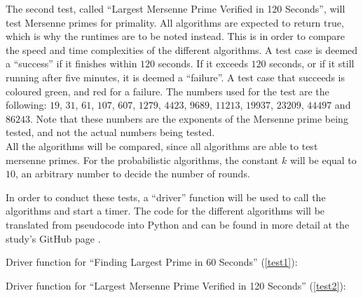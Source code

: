 \documentclass[main.tex]{subfiles}
\begin{document}
The second test, called ``Largest Mersenne Prime Verified in 120 Seconds'', will
test Mersenne primes for primality. All algorithms are expected to return true,
which is why the runtimes are to be noted instead. This is in order to compare
the speed and time complexities of the different algorithms. A test case is
deemed a ``success'' if it finishes within $120$ seconds. If it exceeds $120$
seconds, or if it still running after five minutes, it is deemed a ``failure''.
A test case that succeeds is coloured green, and red for a failure. The numbers
used for the test are the following: $19$, $31$, $61$, $107$, $607$, $1279$,
$4423$, $9689$, $11213$, $19937$, $23209$, $44497$ and $86243$. Note that these
numbers are the exponents of the Mersenne prime being tested, and not
the actual numbers being tested. \\

All the algorithms will be compared, since all algorithms are able to test
mersenne primes. For the probabilistic algorithms, the constant $k$ will be
equal to $10$, an arbitrary number to decide the number of rounds. \newline

In order to conduct these tests, a ``driver'' function will be used to call the
algorithms and start a timer. The code for the different algorithms will be
translated from pseudocode into Python and can be found in more detail at the
study's GitHub page \cite{github}.

\newpage

Driver function for ``Finding Largest Prime in 60 Seconds'' (\ref{test1}):



\newpage

Driver function for ``Largest Mersenne Prime Verified in 120 Seconds''
(\ref{test2}):


\end{document}
